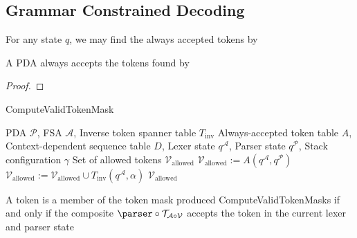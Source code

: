 
\subsection{Grammar Constrained Decoding}

\begin{definition}
    \label{def:FindAlwaysAccepted}
    For any state $q$, we may find the always accepted tokens by 
\end{definition}

\begin{lemma}
    A PDA always accepts the tokens found by 
\end{lemma}
\begin{proof}
\end{proof}


\begin{definition}
    \label{def:FindContextDependentTerminalSequences}
\end{definition}


\begin{algorithm}[ComputedValidTokenMask]
    \caption{ComputeValidTokenMask}
    \label{alg:ComputeTokenMask}
    \begin{algorithmic}[1]
        \Require PDA $\mathcal{P}$, FSA $\mathcal{A}$, Inverse token spanner table $T_{\text{inv}}$
        \Require Always-accepted token table $A$,
        \Require Context-dependent sequence table $D$,
        \Require Lexer state $q^{\mathcal{A}}$, Parser state $q^{\mathcal{P}}$, Stack configuration $\gamma$
        \Ensure Set of allowed tokens $\mathcal{V}_{\text{allowed}}$
        \State $\mathcal{V}_{\text{allowed}} := A(q^{\mathcal{A}}, q^{\mathcal{P}})$
        \State $\mathcal{V}_{\text{allowed}} := \mathcal{V}_{\text{allowed}} \cup T_{\text{inv}}(q^{\mathcal{A}}, \alpha)$
        \EndIf
        \EndFor
        \State \Return $\mathcal{V}_{\text{allowed}}$
    \end{algorithmic}
\end{algorithm}

\begin{lemma}[ComputeTokenMaskCorrect]
    \label{lemma:ComputeTokenMaskCorrect}
    A token is a member of the token mask produced ComputeValidTokenMasks if and only if the composite $\parser \circ \transducer_{\automaton \circ \vocab}$ accepts the token in the current lexer and parser state
\end{lemma}

